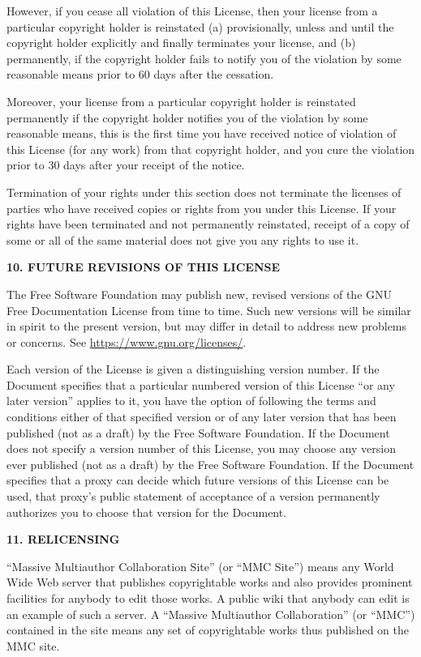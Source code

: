 \documentclass{scrbook}
\begin{document}
However, if you cease all violation of this License, then your license
from a particular copyright holder is reinstated (a) provisionally,
unless and until the copyright holder explicitly and finally
terminates your license, and (b) permanently, if the copyright holder
fails to notify you of the violation by some reasonable means prior to
60 days after the cessation.

Moreover, your license from a particular copyright holder is
reinstated permanently if the copyright holder notifies you of the
violation by some reasonable means, this is the first time you have
received notice of violation of this License (for any work) from that
copyright holder, and you cure the violation prior to 30 days after
your receipt of the notice.

Termination of your rights under this section does not terminate the
licenses of parties who have received copies or rights from you under
this License.  If your rights have been terminated and not permanently
reinstated, receipt of a copy of some or all of the same material does
not give you any rights to use it.


\begin{center}
{\Large\bfseries 10. FUTURE REVISIONS OF THIS LICENSE\par}
\end{center}
The Free Software Foundation may publish new, revised versions
of the GNU Free Documentation License from time to time.  Such new
versions will be similar in spirit to the present version, but may
differ in detail to address new problems or concerns.  See
\url{https://www.gnu.org/licenses/}.

Each version of the License is given a distinguishing version number.
If the Document specifies that a particular numbered version of this
License ``or any later version'' applies to it, you have the option of
following the terms and conditions either of that specified version or
of any later version that has been published (not as a draft) by the
Free Software Foundation.  If the Document does not specify a version
number of this License, you may choose any version ever published (not
as a draft) by the Free Software Foundation.  If the Document
specifies that a proxy can decide which future versions of this
License can be used, that proxy's public statement of acceptance of a
version permanently authorizes you to choose that version for the
Document.


\begin{center}
{\Large\bfseries 11. RELICENSING\par}
\end{center}
``Massive Multiauthor Collaboration Site'' (or ``MMC Site'') means any
World Wide Web server that publishes copyrightable works and also
provides prominent facilities for anybody to edit those works.  A
public wiki that anybody can edit is an example of such a server.  A
``Massive Multiauthor Collaboration'' (or ``MMC'') contained in the
site means any set of copyrightable works thus published on the MMC
site.
\end{document}
